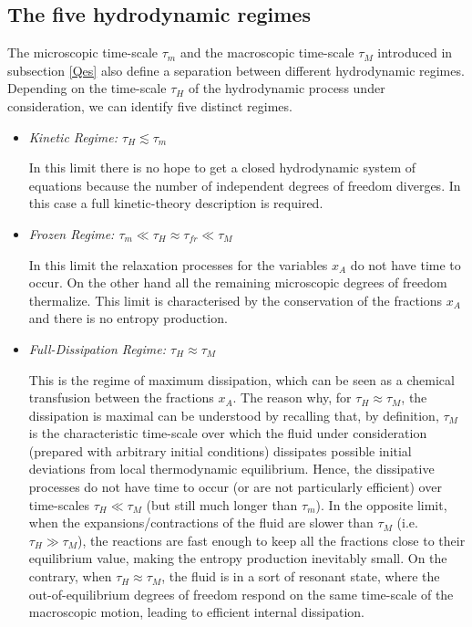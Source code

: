 \documentclass[useAMS,usenatbib,prd,twocolumn,nofootinbib]{revtex4-1}
\begin{document}
\subsection{The five hydrodynamic regimes}\label{timescales!!!!}

The microscopic time-scale $\tau_m$ and the macroscopic time-scale $\tau_M$ introduced in subsection \ref{Qes} also define a separation between different hydrodynamic regimes. Depending on the time-scale $\tau_H$ of the hydrodynamic process under consideration, we can identify five distinct regimes.



\begin{itemize}
\item \textit{Kinetic Regime: $\tau_H \lesssim \tau_m$}

In this limit there is no hope to get a closed hydrodynamic system of equations because the number of independent degrees of freedom diverges. In this case a full kinetic-theory description is required.

\item \textit{Frozen Regime: $\tau_m \ll \tau_H \approx \tau_{fr} \ll \tau_M$}

In this limit the relaxation processes for the variables $x_A$ do not have time to occur. On the other hand all the remaining microscopic degrees of freedom thermalize. This limit is characterised by the conservation of the fractions $x_A$ and there is no entropy production.

\item \textit{Full-Dissipation Regime: $\tau_H \approx \tau_M$}

This is the regime of maximum dissipation, which can be seen as a chemical transfusion between the fractions $x_A$. The reason why, for $\tau_H \approx \tau_M$, the dissipation is maximal can be understood by recalling that, by definition, $\tau_M$ is the characteristic time-scale over which
the  fluid under consideration (prepared with arbitrary initial
conditions) dissipates possible initial deviations from local thermodynamic equilibrium.
Hence, the dissipative processes do not have time to occur (or are not
particularly efficient) over time-scales $\tau_H \ll \tau_M$ (but still much longer than $\tau_m$). In the
opposite limit, when the expansions/contractions of the fluid are slower
than  $\tau_M$ (i.e. $\tau_H \gg\tau_M$), the reactions are fast enough to
keep all the fractions close to their equilibrium value, making the
entropy production inevitably small. On the contrary, when $\tau_H \approx \tau_M$, the fluid is in a sort of resonant state, where the out-of-equilibrium degrees of freedom respond on the same time-scale of the macroscopic motion, leading to efficient internal dissipation.






\end{itemize}
\end{document}
